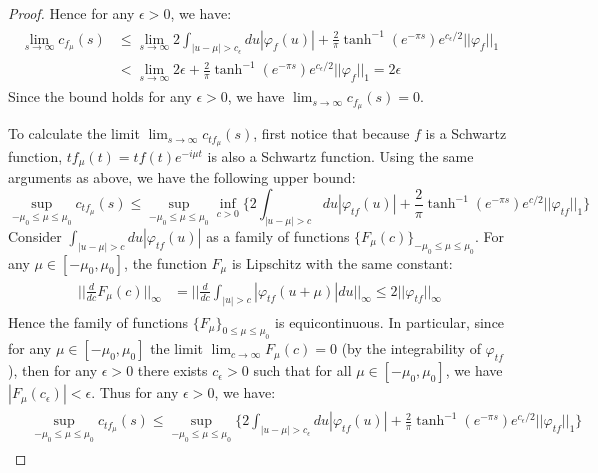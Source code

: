 \documentclass[a4paper,11pt]{article}
\theoremstyle{definition}
\theoremstyle{remark}
\begin{document}
\begin{proof}
    Hence for any $\epsilon > 0$, we have:
    \begin{align}
        \begin{split}
            \lim_{s\rightarrow\infty}c_{f_\mu}(s) &\leq \lim_{s\rightarrow\infty}2\int_{|u-\mu|>c_\epsilon}du|\varphi_f(u)| + \frac{2}{\pi}\tanh^{-1}(e^{-\pi s})e^{c_\epsilon/2}||\varphi_f||_1
            \\&
            <\lim_{s\rightarrow\infty}2\epsilon + \frac{2}{\pi}\tanh^{-1}(e^{-\pi s})e^{c_\epsilon/2}||\varphi_f||_1 = 2\epsilon
        \end{split}
    \end{align}
    Since the bound holds for any $\epsilon > 0$, we have $\lim_{s\rightarrow\infty}c_{f_\mu}(s) = 0$.

    To calculate the limit $\lim_{s\rightarrow\infty}c_{tf_\mu}(s)$, first notice that because $f$ is a Schwartz function, $tf_\mu(t) = tf(t)e^{-i\mu t}$ is also a Schwartz function. Using the same arguments as above, we have the following upper bound:
    \begin{equation}
        \sup_{-\mu_0\leq \mu\leq\mu_0}c_{tf_\mu}(s) \leq \sup_{-\mu_0\leq \mu\leq\mu_0}\inf_{c > 0}\{2\int_{|u - \mu| > c}du|\varphi_{tf}(u)|+ \frac{2}{\pi}\tanh^{-1}(e^{-\pi s})e^{c/2}||\varphi_{tf}||_1\}
    \end{equation}
    Consider $\int_{|u-\mu| > c}du|\varphi_{tf}(u)|$ as a family of functions $\{F_\mu(c)\}_{-\mu_0\leq\mu\leq\mu_0}$. For any $\mu \in [-\mu_0, \mu_0]$, the function $F_\mu$ is Lipschitz with the same constant:
    \begin{align}
        \begin{split}
            ||\frac{d}{dc}F_\mu(c)||_\infty &= ||\frac{d}{dc}\int_{|u| > c}|\varphi_{tf}(u + \mu)|du||_\infty \leq 2||\varphi_{tf}||_\infty
        \end{split}
    \end{align}
    Hence the family of functions $\{F_\mu\}_{0\leq \mu\leq \mu_0}$ is equicontinuous. In particular, since for any $\mu\in [-\mu_0, \mu_0]$ the limit $\lim_{c\rightarrow \infty}F_\mu(c) = 0$ (by the integrability of $\varphi_{tf}$), then for any $\epsilon > 0$ there exists $c_\epsilon > 0$ such that for all $\mu \in [-\mu_0, \mu_0]$, we have $|F_\mu(c_\epsilon)| < \epsilon$. Thus for any $\epsilon > 0$, we have:
    \begin{align}
        \begin{split}
            &\sup_{-\mu_0\leq \mu\leq \mu_0}c_{tf_\mu}(s) \leq \sup_{-\mu_0\leq \mu\leq\mu_0}\{2\int_{|u - \mu| > c_\epsilon} du |\varphi_{tf}(u)| + \frac{2}{\pi}\tanh^{-1}(e^{-\pi s})e^{c_\epsilon / 2}||\varphi_{tf}||_1\}

\end{split}
\end{align}
\end{proof}
\end{document}
